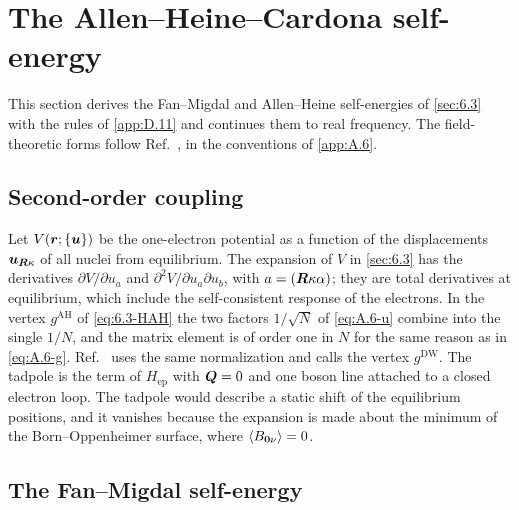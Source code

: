 \section{The Allen--Heine--Cardona self-energy}\label{app:D.16}

This section derives the Fan--Migdal and Allen--Heine self-energies of \cref{sec:6.3} with the rules of \cref{app:D.11} and continues them to real frequency. The field-theoretic forms follow Ref.~\cite[Sects.~V.B and~IX.A]{giustino2017electron}, in the conventions of \cref{app:A.6}.

\subsection*{Second-order coupling}

Let $V(\bm{r};\{\bm{u}\})$ be the one-electron potential as a function of the displacements $\bm{u}_{\bm{R}\kappa}$ of all nuclei from equilibrium. The expansion of $V$ in \cref{sec:6.3} has the derivatives $\partial V/\partial u_a$ and $\partial^2V/\partial u_a\partial u_b$, with $a = (\bm{R}\kappa\alpha)$; they are total derivatives at equilibrium, which include the self-consistent response of the electrons. In the vertex $g^{\mathrm{AH}}$ of \cref{eq:6.3-HAH} the two factors $1/\sqrt N$ of \cref{eq:A.6-u} combine into the single $1/N$, and the matrix element is of order one in $N$ for the same reason as in \cref{eq:A.6-g}. Ref.~\cite[Eqs.~(39) and~(40)]{giustino2017electron} uses the same normalization and calls the vertex $g^{\mathrm{DW}}$. The tadpole is the term of $H_{\mathrm{ep}}$ with $\bm{Q} = 0$ and one boson line attached to a closed electron loop. The tadpole would describe a static shift of the equilibrium positions, and it vanishes because the expansion is made about the minimum of the Born--Oppenheimer surface, where $\langle B_{\bm{0}\nu}\rangle = 0$.

\subsection*{The Fan--Migdal self-energy}

